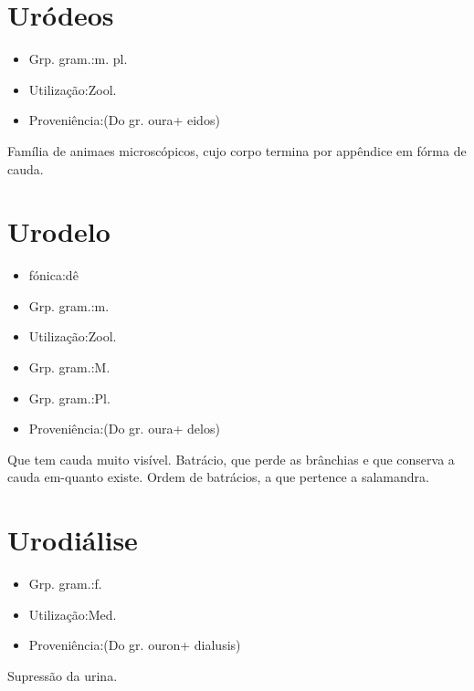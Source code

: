 \documentclass{article}
\begin{document}
\section{Uródeos}
\begin{itemize}
\item {Grp. gram.:m. pl.}
\end{itemize}
\begin{itemize}
\item {Utilização:Zool.}
\end{itemize}
\begin{itemize}
\item {Proveniência:(Do gr. \textunderscore oura\textunderscore  + \textunderscore eidos\textunderscore )}
\end{itemize}
Família de animaes microscópicos, cujo corpo termina por appêndice em fórma de cauda.
\section{Urodelo}
\begin{itemize}
\item {fónica:dê}
\end{itemize}
\begin{itemize}
\item {Grp. gram.:m.}
\end{itemize}
\begin{itemize}
\item {Utilização:Zool.}
\end{itemize}
\begin{itemize}
\item {Grp. gram.:M.}
\end{itemize}
\begin{itemize}
\item {Grp. gram.:Pl.}
\end{itemize}
\begin{itemize}
\item {Proveniência:(Do gr. \textunderscore oura\textunderscore  + \textunderscore delos\textunderscore )}
\end{itemize}
Que tem cauda muito visível.
Batrácio, que perde as brânchias e que conserva a cauda em-quanto existe.
Ordem de batrácios, a que pertence a salamandra.
\section{Urodiálise}
\begin{itemize}
\item {Grp. gram.:f.}
\end{itemize}
\begin{itemize}
\item {Utilização:Med.}
\end{itemize}
\begin{itemize}
\item {Proveniência:(Do gr. \textunderscore ouron\textunderscore  + \textunderscore dialusis\textunderscore )}
\end{itemize}
Supressão da urina.
\end{document}
